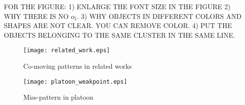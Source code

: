 FOR THE FIGURE: 1) ENLARGE THE FONT SIZE IN THE FIGURE 2) WHY THERE IS NO $o_5$. 3) WHY OBJECTS IN DIFFERENT COLORS AND SHAPES ARE NOT CLEAR. YOU CAN REMOVE COLOR. 4) PUT THE OBJECTS BELONGING TO THE SAME CLUSTER IN THE SAME LINE.

\begin{figure} [t]
\center
\texttt{[image: related\_work.eps]}
\caption{Co-moving patterns in related works}
\label{fig:related_work}
\end{figure}




\begin{figure}[h]
\center
\texttt{[image: platoon\_weakpoint.eps]}
\caption{Miss-pattern in platoon}
\label{fig:platoon_weakpoint}
\end{figure}





